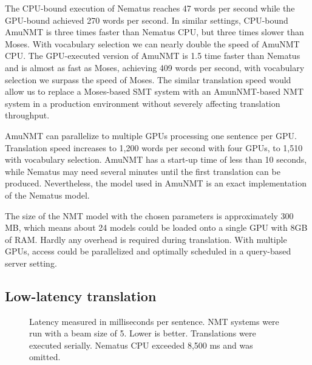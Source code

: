 \documentclass[11pt]{article}
\begin{document}
The CPU-bound execution of Nematus reaches 47 words per second while the GPU-bound achieved 270 words per second. In similar settings, CPU-bound AmuNMT is three times faster than Nematus CPU, but three times slower than Moses. With vocabulary selection we can nearly double the speed of AmuNMT CPU. The GPU-executed version of AmuNMT is 1.5 time faster than Nematus and is almost as fast as Moses, achieving 409 words per second, with vocabulary selection we surpass the speed of Moses. The similar translation speed would allow us to replace a Moses-based SMT system with an AmunNMT-based NMT system in a production environment without severely affecting translation throughput. 

AmuNMT can parallelize to multiple GPUs processing one sentence per GPU. Translation speed increases to 1,200 words per second with four GPUs, to 1,510 with vocabulary selection. 
AmuNMT has a start-up time of less than 10 seconds, while Nematus may need several minutes until the first translation can be produced. Nevertheless, the model used in AmuNMT is an exact implementation of the Nematus model.

The size of the NMT model with the chosen parameters is approximately 300 MB, which means about 24 models could be loaded onto a single GPU with 8GB of RAM. Hardly any overhead is required during translation. With multiple GPUs, access could be parallelized and optimally scheduled in a query-based server setting. 

\subsection{Low-latency translation}

\begin{figure}[t]
\centering
{}
\caption{Latency measured in milliseconds per sentence. NMT systems were run with a beam size of 5. Lower is better. Translations were executed serially. Nematus CPU exceeded 8,500 ms and was omitted.}\label{latency}
\end{figure}
\end{document}
